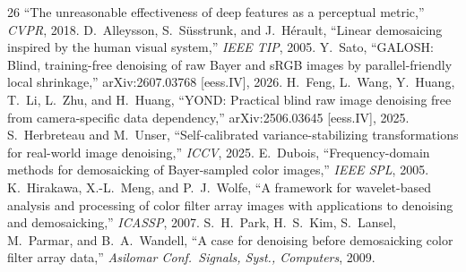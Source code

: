 \documentclass[journal]{IEEEtran}
\begin{document}
\begin{thebibliography}{26}
``The unreasonable effectiveness of deep features as a perceptual metric,''
\emph{CVPR}, 2018.
 D.~Alleysson, S.~S\"usstrunk, and J.~H\'erault,
``Linear demosaicing inspired by the human visual system,'' \emph{IEEE
TIP}, 2005.
 Y.~Sato, ``GALOSH: Blind, training-free denoising of raw
Bayer and sRGB images by parallel-friendly local shrinkage,'' arXiv:2607.03768
[eess.IV], 2026.
 H.~Feng, L.~Wang, Y.~Huang, T.~Li, L.~Zhu, and H.~Huang,
``YOND: Practical blind raw image denoising free from camera-specific data
dependency,'' arXiv:2506.03645 [eess.IV], 2025.
 S.~Herbreteau and M.~Unser, ``Self-calibrated
variance-stabilizing transformations for real-world image denoising,''
\emph{ICCV}, 2025.
 E.~Dubois, ``Frequency-domain methods for demosaicking of
Bayer-sampled color images,'' \emph{IEEE SPL}, 2005.
 K.~Hirakawa, X.-L.~Meng, and P.~J.~Wolfe, ``A framework for
wavelet-based analysis and processing of color filter array images with
applications to denoising and demosaicking,'' \emph{ICASSP}, 2007.
 S.~H.~Park, H.~S.~Kim, S.~Lansel, M.~Parmar, and
B.~A.~Wandell, ``A case for denoising before demosaicking color filter array
data,'' \emph{Asilomar Conf.\ Signals, Syst., Computers}, 2009.
\end{thebibliography}
\end{document}
